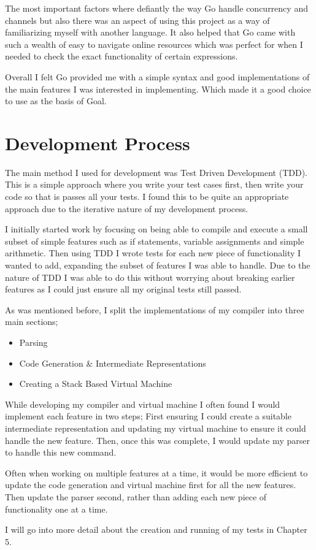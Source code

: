 The most important factors where defiantly the way Go handle concurrency and channels but also there was an aspect of using this project as a way of familiarizing myself with another language. It also helped that Go came with such a wealth of easy to navigate online resources which was perfect for when I needed to check the exact functionality of certain expressions.

Overall I felt Go provided me with a simple syntax and good implementations of the main features I was interested in implementing. Which made it a good choice to use as the basis of Goal.

\section{Development Process }

The main method I used for development was Test Driven Development (TDD). This is a simple approach where you write your test cases first, then write your code so that is passes all your tests. I found this to be quite an appropriate approach due to the iterative nature of my development process. 

I initially started work by focusing on being able to compile and execute a small subset of simple features such as if statements, variable assignments and simple arithmetic. Then using TDD I wrote tests for each new piece of functionality I wanted to add, expanding the subset of features I was able to handle. Due to the nature of TDD I was able to do this without worrying about breaking earlier features as I could just ensure all my original tests still passed.

As was mentioned before, I split the implementations of my compiler into three main sections;

\begin{itemize}
	\item Parsing
	\item Code Generation \& Intermediate Representations 
	\item Creating a Stack Based Virtual Machine
\end{itemize}

While developing my compiler and virtual machine I often found I would implement each feature in two steps; First ensuring I could create a suitable intermediate representation and updating my virtual machine to ensure it could handle the new feature. Then, once this was complete, I would update my parser to handle this new command. 

Often when working on multiple features at a time, it would be more efficient to update the code generation and virtual machine first for all the new features. Then update the parser second, rather than adding each new piece of functionality one at a time. 

I will go into more detail about the creation and running of my tests in Chapter 5. 
   